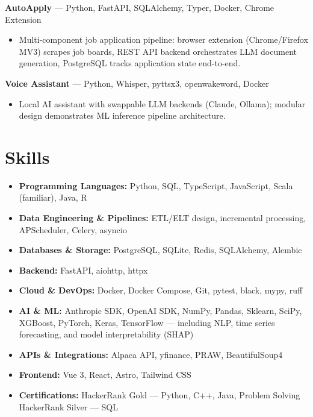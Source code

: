\documentclass[10pt]{article}
\begin{document}
\textbf{AutoApply} --- Python, FastAPI, SQLAlchemy, Typer, Docker, Chrome Extension 
\begin{itemize}
  \item Multi-component job application pipeline: browser extension (Chrome/Firefox MV3) scrapes job boards, REST API backend orchestrates LLM document generation, PostgreSQL tracks application state end-to-end.
\end{itemize}

\textbf{Voice Assistant} --- Python, Whisper, pyttsx3, openwakeword, Docker
\begin{itemize}
  \item Local AI assistant with swappable LLM backends (Claude, Ollama); modular design demonstrates ML inference pipeline architecture.
\end{itemize}

\section{Skills}

\begin{itemize}
  \item \textbf{Programming Languages:} Python, SQL, TypeScript, JavaScript, Scala (familiar), Java, R
  \item \textbf{Data Engineering \& Pipelines:} ETL/ELT design, incremental processing, APScheduler, Celery, asyncio
  \item \textbf{Databases \& Storage:} PostgreSQL, SQLite, Redis, SQLAlchemy, Alembic
  \item \textbf{Backend:} FastAPI, aiohttp, httpx
  \item \textbf{Cloud \& DevOps:} Docker, Docker Compose, Git, pytest, black, mypy, ruff
  \item \textbf{AI \& ML:} Anthropic SDK, OpenAI SDK, NumPy, Pandas, Sklearn, SciPy, XGBoost, PyTorch, Keras, TensorFlow --- including NLP, time series forecasting, and model interpretability (SHAP)
  \item \textbf{APIs \& Integrations:} Alpaca API, yfinance, PRAW, BeautifulSoup4
  \item \textbf{Frontend:} Vue 3, React, Astro, Tailwind CSS
  \item \textbf{Certifications:} HackerRank Gold --- Python, C++, Java, Problem Solving \textbar{} HackerRank Silver --- SQL
\end{itemize}
\end{document}
